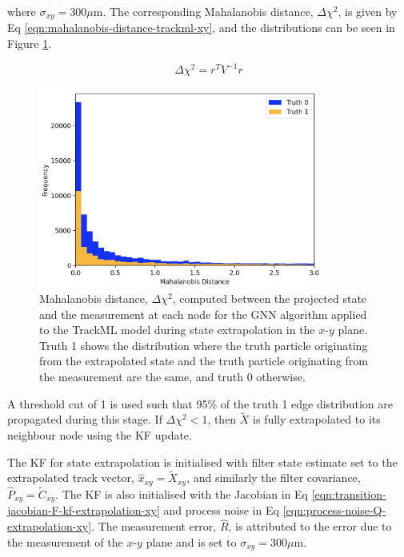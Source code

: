 where $\sigma_{xy} = 300\mu$m. The corresponding Mahalanobis distance, $\Delta \chi^{2}$, is given by Eq \eqref{eqn:mahalanobis-distance-trackml-xy}, and the distributions can be seen in Figure \ref{fig:mahalanobis-threshold-trackml-xy}.

\begin{equation}
\Delta \chi^{2} = r^{T} {V}^{-1} r
\label{eqn:mahalanobis-distance-trackml-xy}
\end{equation}


\begin{figure}[htbp]
    \centering
    \includegraphics[width=0.85\textwidth]{images/6-trackml/mahalanobis-threshold-trackml-xy.png}
    \caption{Mahalanobis distance, $\Delta \chi^{2}$, computed between the projected state and the measurement at each node for the GNN algorithm applied to the TrackML model during state extrapolation in the $x$-$y$ plane. Truth 1 shows the distribution where the truth particle originating from the extrapolated state and the truth particle originating from the measurement are the same, and truth 0 otherwise.}
    \label{fig:mahalanobis-threshold-trackml-xy}%
\end{figure}


A threshold cut of 1 is used such that 95\% of the truth 1 edge distribution are propagated during this stage. If $\Delta \chi^{2} < 1$, then $\tilde{X}$ is fully extrapolated to its neighbour node using the KF update.




The KF for state extrapolation is initialised with filter state estimate set to the extrapolated track vector, $\hat{x}_{xy} = \tilde{X}_{xy}$, and similarly the filter covariance, $\hat{P}_{xy} = \tilde{C}_{xy}$. The KF is also initialised with the Jacobian in Eq \eqref{eqn:transition-jacobian-F-kf-extrapolation-xy} and process noise in Eq \eqref{eqn:process-noise-Q-extrapolation-xy}. The measurement error, $\hat{R}$, is attributed to the error due to the measurement of the $x$-$y$ plane and is set to $\sigma_{xy} = 300\mu$m.











